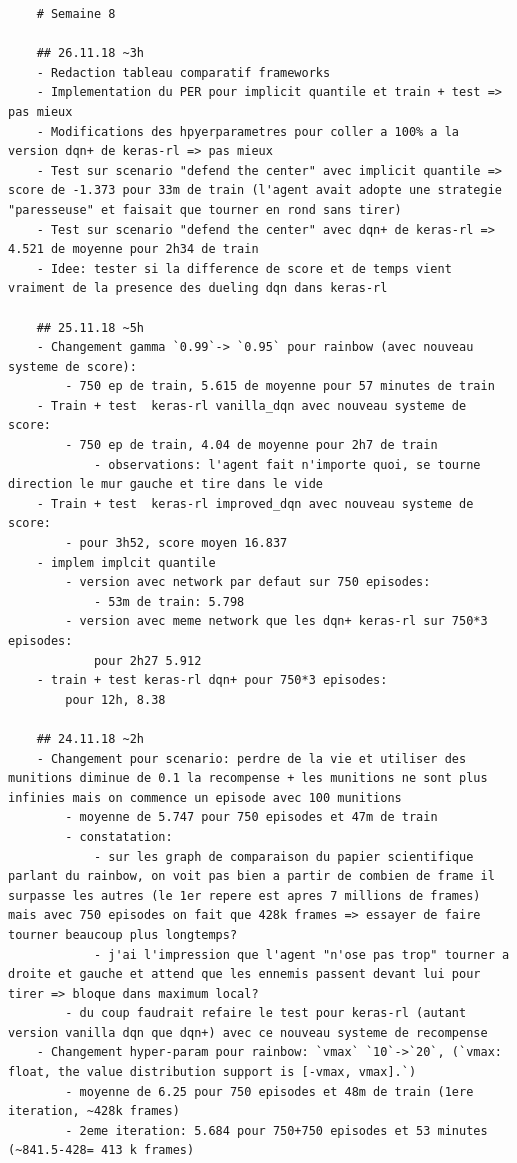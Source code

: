 \documentclass[a4paper,10pt,openany,oneside]{report}
\begin{document}
\begin{lstlisting}
	# Semaine 8
	
	## 26.11.18 ~3h
	- Redaction tableau comparatif frameworks
	- Implementation du PER pour implicit quantile et train + test => pas mieux
	- Modifications des hpyerparametres pour coller a 100% a la version dqn+ de keras-rl => pas mieux
	- Test sur scenario "defend the center" avec implicit quantile => score de -1.373 pour 33m de train (l'agent avait adopte une strategie "paresseuse" et faisait que tourner en rond sans tirer)
	- Test sur scenario "defend the center" avec dqn+ de keras-rl => 4.521 de moyenne pour 2h34 de train
	- Idee: tester si la difference de score et de temps vient vraiment de la presence des dueling dqn dans keras-rl
	
	## 25.11.18 ~5h
	- Changement gamma `0.99`-> `0.95` pour rainbow (avec nouveau systeme de score):
		- 750 ep de train, 5.615 de moyenne pour 57 minutes de train
	- Train + test  keras-rl vanilla_dqn avec nouveau systeme de score:
		- 750 ep de train, 4.04 de moyenne pour 2h7 de train
			- observations: l'agent fait n'importe quoi, se tourne direction le mur gauche et tire dans le vide
	- Train + test  keras-rl improved_dqn avec nouveau systeme de score:
		- pour 3h52, score moyen 16.837
	- implem implcit quantile
		- version avec network par defaut sur 750 episodes:
			- 53m de train: 5.798
		- version avec meme network que les dqn+ keras-rl sur 750*3 episodes:
			pour 2h27 5.912
	- train + test keras-rl dqn+ pour 750*3 episodes:
		pour 12h, 8.38
	
	## 24.11.18 ~2h
	- Changement pour scenario: perdre de la vie et utiliser des munitions diminue de 0.1 la recompense + les munitions ne sont plus infinies mais on commence un episode avec 100 munitions
		- moyenne de 5.747 pour 750 episodes et 47m de train
		- constatation: 
			- sur les graph de comparaison du papier scientifique parlant du rainbow, on voit pas bien a partir de combien de frame il surpasse les autres (le 1er repere est apres 7 millions de frames) mais avec 750 episodes on fait que 428k frames => essayer de faire tourner beaucoup plus longtemps?
			- j'ai l'impression que l'agent "n'ose pas trop" tourner a droite et gauche et attend que les ennemis passent devant lui pour tirer => bloque dans maximum local?
		- du coup faudrait refaire le test pour keras-rl (autant version vanilla dqn que dqn+) avec ce nouveau systeme de recompense
	- Changement hyper-param pour rainbow: `vmax` `10`->`20`, (`vmax: float, the value distribution support is [-vmax, vmax].`)
		- moyenne de 6.25 pour 750 episodes et 48m de train (1ere iteration, ~428k frames)
		- 2eme iteration: 5.684 pour 750+750 episodes et 53 minutes (~841.5-428= 413 k frames)
	

\end{lstlisting}
\end{document}
